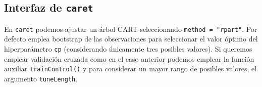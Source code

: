 \documentclass[
  spanish,
]{book}
\newenvironment{Shaded}{\begin{snugshade}}{\end{snugshade}}
\newcommand{\AttributeTok}[1]{\textcolor[rgb]{0.77,0.63,0.00}{#1}}
\newcommand{\CommentTok}[1]{\textcolor[rgb]{0.56,0.35,0.01}{\textit{#1}}}
\newcommand{\DecValTok}[1]{\textcolor[rgb]{0.00,0.00,0.81}{#1}}
\newcommand{\FunctionTok}[1]{\textcolor[rgb]{0.00,0.00,0.00}{#1}}
\newcommand{\NormalTok}[1]{#1}
\newcommand{\OtherTok}[1]{\textcolor[rgb]{0.56,0.35,0.01}{#1}}
\newcommand{\SpecialCharTok}[1]{\textcolor[rgb]{0.00,0.00,0.00}{#1}}
\newcommand{\StringTok}[1]{\textcolor[rgb]{0.31,0.60,0.02}{#1}}
\theoremstyle{break}
\theoremstyle{definition}
\theoremstyle{definition}
\theoremstyle{definition}
\theoremstyle{definition}
\theoremstyle{remark}
\begin{document}
\hypertarget{interfaz-de-caret}{%
\subsection{\texorpdfstring{Interfaz de \texttt{caret}}{Interfaz de caret}}\label{interfaz-de-caret}}

En \texttt{caret} podemos ajustar un árbol CART seleccionando \texttt{method\ =\ "rpart"}.
Por defecto emplea bootstrap de las observaciones para seleccionar el valor óptimo del hiperparámetro \texttt{cp} (considerando únicamente tres posibles valores).
Si queremos emplear validación cruzada como en el caso anterior podemos emplear la función auxiliar \texttt{trainControl()} y para considerar un mayor rango de posibles valores, el argumento \texttt{tuneLength}.

\begin{Shaded}
\end{Shaded}
\end{document}
